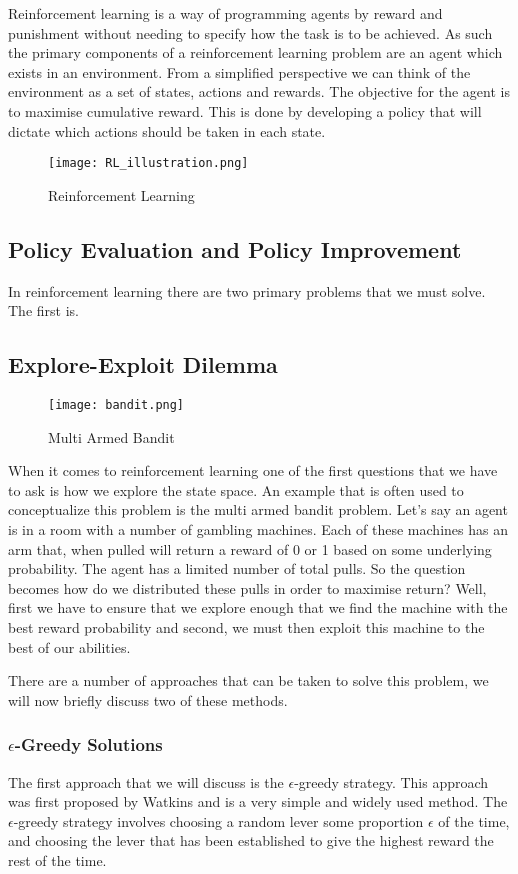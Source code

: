 Reinforcement learning is a way of programming agents by reward and punishment without needing to specify how the
task is to be achieved\citep{kaelbling1996reinforcement}.
As such the primary components of a reinforcement learning problem are an agent which exists in an environment.
From a simplified perspective we can think of the environment as a set of states, actions and rewards.
The objective for the agent is to maximise cumulative reward.
This is done by developing a policy that will dictate which actions should be taken in each state.
\begin{figure}
    \texttt{[image: RL\_illustration.png]}
    \caption{Reinforcement Learning}
\end{figure}

\subsection{Policy Evaluation and Policy Improvement}\label{subsec:policyEvalPolicyImp}
In reinforcement learning there are two primary problems that we must solve.
The first is.

\subsection{Explore-Exploit Dilemma}\label{subsec:exploreExploit}
\begin{figure}
    \texttt{[image: bandit.png]}
    \caption{Multi Armed Bandit}
\end{figure}
When it comes to reinforcement learning one of the first questions that we have to ask is how we explore
the state space.
An example that is often used to conceptualize this problem is the multi armed bandit problem.
Let's say an agent is in a room with a number of gambling machines.
Each of these machines has an arm that, when pulled will return a reward of 0 or 1 based on some underlying
probability\citep{kaelbling1996reinforcement}.
The agent has a limited number of total pulls.
So the question becomes how do we distributed these pulls in order to maximise return?
Well, first we have to ensure that we explore enough that we find the machine with the best reward probability
and second, we must then exploit this machine to the best of our abilities.

There are a number of approaches that can be taken to solve this problem, we will now briefly discuss two of these
methods.

\subsubsection{$\epsilon$-Greedy Solutions}\label{subsec:eGreedy}
The first approach that we will discuss is the $\epsilon$-greedy strategy.
This approach was first proposed by Watkins\citep{watkins1989learning} and is a very simple and widely used method.
The $\epsilon$-greedy strategy involves choosing a random lever some proportion $\epsilon$ of the time, and
choosing the lever that has been established to give the highest reward the rest of the time.

